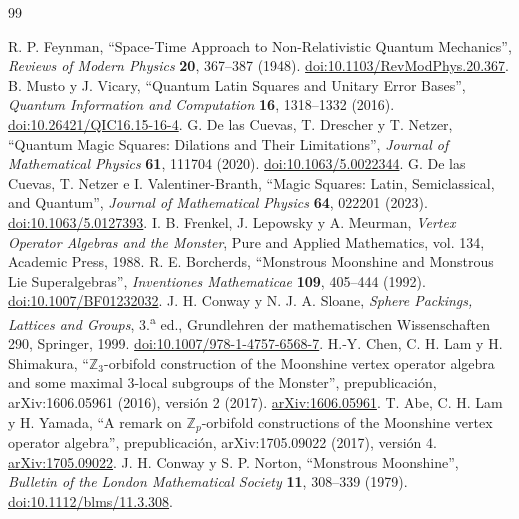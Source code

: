 \begin{thebibliography}{99}
\fontsize{9}{10.8}\selectfont
\setlength{\itemsep}{2.5pt}
\setlength{\parskip}{0pt}
\raggedright
{}
{}
 R. P. Feynman, ``Space-Time Approach to Non-Relativistic Quantum Mechanics'', \emph{Reviews of Modern Physics} \textbf{20}, 367--387 (1948). \href{https://doi.org/10.1103/RevModPhys.20.367}{doi:10.1103/RevModPhys.20.367}.
 B. Musto y J. Vicary, ``Quantum Latin Squares and Unitary Error Bases'', \emph{Quantum Information and Computation} \textbf{16}, 1318--1332 (2016). \href{https://doi.org/10.26421/QIC16.15-16-4}{doi:10.26421/QIC16.15-16-4}.
 G. De las Cuevas, T. Drescher y T. Netzer, ``Quantum Magic Squares: Dilations and Their Limitations'', \emph{Journal of Mathematical Physics} \textbf{61}, 111704 (2020). \href{https://doi.org/10.1063/5.0022344}{doi:10.1063/5.0022344}.
 G. De las Cuevas, T. Netzer e I. Valentiner-Branth, ``Magic Squares: Latin, Semiclassical, and Quantum'', \emph{Journal of Mathematical Physics} \textbf{64}, 022201 (2023). \href{https://doi.org/10.1063/5.0127393}{doi:10.1063/5.0127393}.
 I. B. Frenkel, J. Lepowsky y A. Meurman, \emph{Vertex Operator Algebras and the Monster}, Pure and Applied Mathematics, vol. 134, Academic Press, 1988.
 R. E. Borcherds, ``Monstrous Moonshine and Monstrous Lie Superalgebras'', \emph{Inventiones Mathematicae} \textbf{109}, 405--444 (1992). \href{https://doi.org/10.1007/BF01232032}{doi:10.1007/BF01232032}.
 J. H. Conway y N. J. A. Sloane, \emph{Sphere Packings, Lattices and Groups}, 3.\textsuperscript{a} ed., Grundlehren der mathematischen Wissenschaften 290, Springer, 1999. \href{https://doi.org/10.1007/978-1-4757-6568-7}{doi:10.1007/978-1-4757-6568-7}.
 H.-Y. Chen, C. H. Lam y H. Shimakura, ``\(\mathbb Z_3\)-orbifold construction of the Moonshine vertex operator algebra and some maximal \(3\)-local subgroups of the Monster'', prepublicación, arXiv:1606.05961 (2016), versión 2 (2017). \href{https://arxiv.org/abs/1606.05961}{arXiv:1606.05961}.
 T. Abe, C. H. Lam y H. Yamada, ``A remark on \(\mathbb Z_p\)-orbifold constructions of the Moonshine vertex operator algebra'', prepublicación, arXiv:1705.09022 (2017), versión 4. \href{https://arxiv.org/abs/1705.09022v4}{arXiv:1705.09022}.
 J. H. Conway y S. P. Norton, ``Monstrous Moonshine'', \emph{Bulletin of the London Mathematical Society} \textbf{11}, 308--339 (1979). \href{https://doi.org/10.1112/blms/11.3.308}{doi:10.1112/blms/11.3.308}.

\end{thebibliography}
